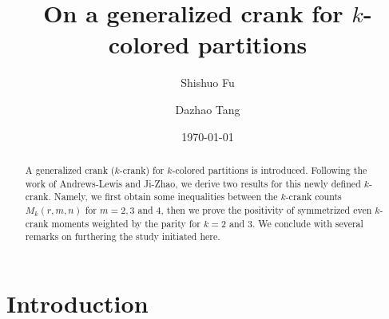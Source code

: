 \documentclass[12pt]{amsart}
\numberwithin{equation}{section}
\theoremstyle{plain}
\theoremstyle{definition}
\begin{document}
\title[On a generalized crank]{On a generalized crank for $k$-colored partitions}

\author[S. Fu]{Shishuo Fu}
\address[Shishuo Fu]{College of Mathematics and Statistics, Chongqing University, Huxi Campus LD506, Chongqing 401331, P.R. China}


\author[D. Tang]{Dazhao Tang}

\address[Dazhao Tang]{College of Mathematics and Statistics, Chongqing University, Huxi Campus LD208, Chongqing 401331, P.R. China}

\date{\today}


\begin{abstract}
A generalized crank ($k$-crank) for $k$-colored partitions is introduced. Following the work of Andrews-Lewis and Ji-Zhao, we derive two results for this newly defined $k$-crank. Namely, we first obtain some inequalities between the $k$-crank counts $M_{k}(r,m,n)$ for $m=2,3$ and $4$, then we prove the positivity of symmetrized even $k$-crank moments weighted by the parity for $k=2$ and $3$. We conclude with several remarks on furthering the study initiated here.
\end{abstract}




\maketitle






\section{Introduction}\label{sec1}
\end{document}
